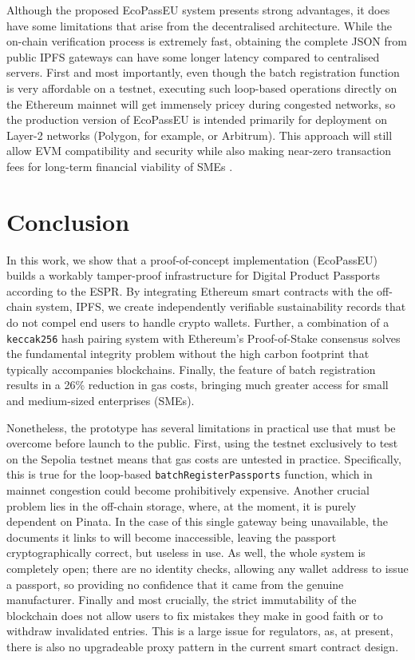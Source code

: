 \documentclass[runningheads]{llncs}
\begin{document}
	
	
	Although the proposed EcoPassEU system presents strong advantages, it does 
	have some limitations that arise from the decentralised architecture. While 
	the on-chain verification process is extremely fast, obtaining the complete 
	JSON from public IPFS gateways can have some longer latency compared to 
	centralised servers.
	First and most importantly, even though the batch registration function is 
	very affordable on a testnet, executing such loop-based operations directly 
	on the Ethereum mainnet will get immensely pricey during congested networks, 
	so the production version of EcoPassEU is intended primarily for deployment 
	on Layer-2 networks (Polygon, for example, or Arbitrum). This approach will still allow EVM compatibility and security while also making near-zero transaction fees for long-term financial viability of SMEs 
	\cite{Radomski2018ERC1155}.
	
	
	\section{Conclusion}
	
	In this work, we show that a proof-of-concept implementation (EcoPassEU) 
	builds a workably tamper-proof infrastructure for Digital Product Passports 
	according to the ESPR. By integrating Ethereum smart contracts 
	\cite{Antonopoulos2018Mastering} with the off-chain system, IPFS, we create 
	independently verifiable sustainability records that do not compel end users 
	to handle crypto wallets. Further, a combination of a \texttt{keccak256} 
	hash pairing system \cite{NIST2015SHA3} with Ethereum's Proof-of-Stake 
	consensus \cite{EthereumMerge2022} solves the fundamental integrity problem 
	without the high carbon footprint that typically accompanies blockchains. 
	Finally, the feature of batch registration results in a 26\% reduction in 
	gas costs, bringing much greater access for small and medium-sized 
	enterprises (SMEs).
	
	Nonetheless, the prototype has several limitations in practical use that 
	must be overcome before launch to the public. First, using the testnet 
	exclusively to test on the Sepolia testnet means that gas costs are untested 
	in practice. Specifically, this is true for the loop-based 
	\texttt{batchRegisterPassports} function, which in mainnet congestion could 
	become prohibitively expensive. Another crucial problem lies in the off-chain 
	storage, where, at the moment, it is purely dependent on Pinata. In the case 
	of this single gateway being unavailable, the documents it links to will 
	become inaccessible, leaving the passport cryptographically correct, but 
	useless in use. As well, the whole system is completely open; there are no 
	identity checks, allowing any wallet address to issue a passport, so 
	providing no confidence that it came from the genuine manufacturer. Finally 
	and most crucially, the strict immutability of the blockchain does not allow 
	users to fix mistakes they make in good faith or to withdraw invalidated 
	entries. This is a large issue for regulators, as, at present, there is also 
	no upgradeable proxy pattern in the current smart contract design.
	
\end{document}
